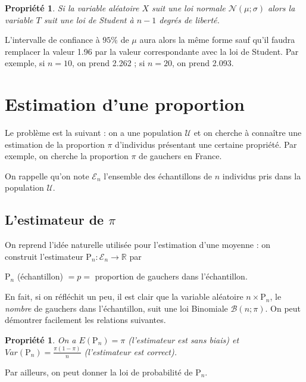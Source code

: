 \documentclass[12pt, a4paper]{book}
\newtheorem{prop}[thm]{Propriété}
\numberwithin{equation}{section}
\begin{document}
\begin{prop}
Si la variable aléatoire $X$ suit une loi normale $\mathcal{N}(\mu ; \sigma)$ alors la variable $T$ suit
une loi de Student à $n-1$ degrés de liberté.
\end{prop}

L'intervalle de confiance à $95 \%$ de $\mu$ aura alors la même forme sauf qu'il faudra remplacer la 
valeur 1.96 par la valeur correspondante avec la loi de Student. Par exemple, si $n=10$, on prend 2.262 ;
si $n=20$, on prend 2.093. 


\section{Estimation d'une proportion}

Le problème est la suivant : on a une population $\mathcal{U}$ et on cherche  à connaître une estimation 
de la proportion $\pi$ d'individus présentant une certaine propriété.
Par exemple, on cherche la proportion $\pi$ de gauchers en France.

On rappelle qu'on note $\mathcal{E}_n$ l'ensemble des échantillons de $n$ individus pris dans la population $\mathcal{U}$.\\

\subsection[L'estimateur]{L'estimateur de $\pi$}

On reprend l'idée naturelle utilisée pour l'estimation d'une moyenne :  on construit 
l'estimateur $\mathrm{P}_n : \mathcal{E}_n \longrightarrow \mathbb{R}$ par
\begin{center}
$\mathrm{P}_n$ (échantillon) $=p=$ proportion de gauchers dans l'échantillon.
\end{center}

En fait, si on réfléchit un peu, il est clair que la variable aléatoire $n\times \mathrm{P}_n$, le \emph{nombre} de gauchers dans l'échantillon, suit une loi Binomiale $\mathcal{B}(n;\pi)$. On peut démontrer facilement les relations suivantes.
 
\begin{prop} On a 
 $E(\mathrm{P}_n)=\pi$ (l'estimateur est sans biais)
et  $Var(\mathrm{P}_n)=\frac{\pi(1-\pi)}{n}$ (l'estimateur est correct).
\end{prop}

Par ailleurs, on peut donner la loi de probabilité de $\mathrm{P}_n$.
\end{document}
